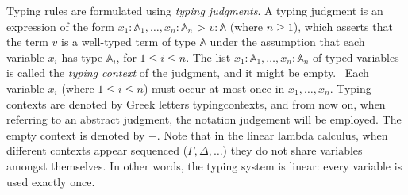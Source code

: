 Typing rules are formulated using \emph{typing judgments}. A typing judgment is an expression of the form $x_{1}: \mathbb{A}_{1}, \ldots, x_{n}: \mathbb{A}_{n} \hspace{1pt} \triangleright \hspace{1pt} v: \mathbb{A}$ (where $n \geq 1$), which asserts that the term $v$ is a well-typed term of type $\mathbb{A}$ under the assumption that each variable $x_{i}$ has type $\mathbb{A}_{i}$, for $1 \leq i \leq n$. The list $x_{1}: \mathbb{A}_{1}, \ldots, x_{n}: \mathbb{A}_{n}$ of typed variables is called the \emph{typing context} of the judgment, and it might be empty.  Each variable $x_i$ (where $1 \leq i \leq n$) must occur at most once in $x_1, \ldots, x_n$. Typing contexts are denoted by Greek letters \gls{typingcontexts}, and from now on, when referring to an abstract judgment, the notation \gls{judgement} will be employed.
The empty context is denoted by $-$. Note that in the linear lambda calculus, when different contexts appear sequenced (\eg $\Gamma, \Delta, \ldots$) they do not share variables amongst themselves. In other words, the typing system is linear: every variable is used exactly once.

